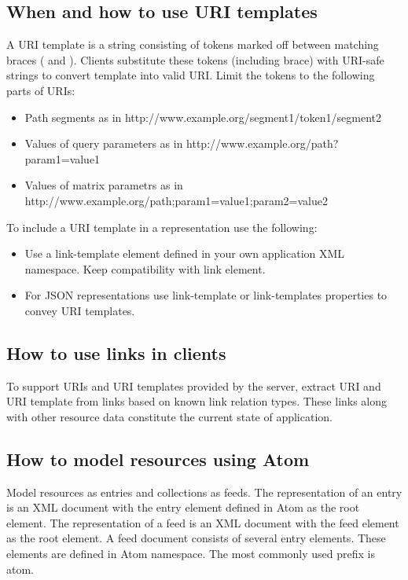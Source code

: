 \documentclass[11pt,a4paper]{article}
\begin{document}
\subsection{When and how to use URI templates}
A URI template is a string consisting of tokens marked off between matching braces ({ and }). Clients substitute these tokens (including brace) with URI-safe strings to convert template into valid URI. Limit the tokens to the following parts of URIs:
\begin{itemize}
	\item Path segments as in http://www.example.org/segment1/{token1}/segment2
	\item Values of query parameters as in http://www.example.org/path?param1={value1}
	\item Values of matrix parametrs as in http://www.example.org/path;param1={value1};param2={value2}
\end{itemize}

To include a URI template in a representation use the following:
\begin{itemize}
	\item Use a link-template element defined in your own application XML namespace. Keep compatibility with link element.
	\item For JSON representations use link-template or link-templates properties to convey URI templates.
\end{itemize}

\subsection{How to use links in clients}
To support URIs and URI templates provided by the server, extract URI and URI template from links based on known link relation types. These links along with other resource data constitute the current state of application.

\subsection{How to model resources using Atom}
Model resources as entries and collections as feeds. The representation of an entry is an XML document with the entry element defined in Atom as the root element. The representation of a feed is an XML document with the feed element as the root element. A feed document consists of several entry elements. These elements are defined in Atom namespace. The most commonly used prefix is atom.
\end{document}
